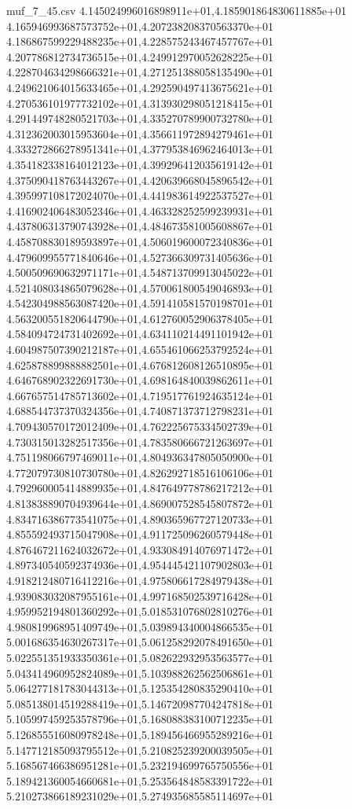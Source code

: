 \begin{filecontents*}{muf_7_45.csv}
4.145024996016898911e+01,4.185901864830611885e+01
4.165946993687573752e+01,4.207238208370563370e+01
4.186867599229488235e+01,4.228575243467457767e+01
4.207786812734736515e+01,4.249912970052628225e+01
4.228704634298666321e+01,4.271251388058135490e+01
4.249621064015633465e+01,4.292590497413675621e+01
4.270536101977732102e+01,4.313930298051218415e+01
4.291449748280521703e+01,4.335270789900732780e+01
4.312362003015953604e+01,4.356611972894279461e+01
4.333272866278951341e+01,4.377953846962464013e+01
4.354182338164012123e+01,4.399296412035619142e+01
4.375090418763443267e+01,4.420639668045896542e+01
4.395997108172024070e+01,4.441983614922537527e+01
4.416902406483052346e+01,4.463328252599239931e+01
4.437806313790743928e+01,4.484673581005608867e+01
4.458708830189593897e+01,4.506019600072340836e+01
4.479609955771840646e+01,4.527366309731405636e+01
4.500509690632971171e+01,4.548713709913045022e+01
4.521408034865079628e+01,4.570061800549046893e+01
4.542304988563087420e+01,4.591410581570198701e+01
4.563200551820644790e+01,4.612760052906378405e+01
4.584094724731402692e+01,4.634110214491101942e+01
4.604987507390212187e+01,4.655461066253792524e+01
4.625878899888882501e+01,4.676812608126510895e+01
4.646768902322691730e+01,4.698164840039862611e+01
4.667657514785713602e+01,4.719517761924635124e+01
4.688544737370324356e+01,4.740871373712798231e+01
4.709430570172012409e+01,4.762225675334502739e+01
4.730315013282517356e+01,4.783580666721263697e+01
4.751198066797469011e+01,4.804936347805050900e+01
4.772079730810730780e+01,4.826292718516106106e+01
4.792960005414889935e+01,4.847649778786217212e+01
4.813838890704939644e+01,4.869007528545807872e+01
4.834716386773541075e+01,4.890365967727120733e+01
4.855592493715047908e+01,4.911725096260579448e+01
4.876467211624032672e+01,4.933084914076971472e+01
4.897340540592374936e+01,4.954445421107902803e+01
4.918212480716412216e+01,4.975806617284979438e+01
4.939083032087955161e+01,4.997168502539716428e+01
4.959952194801360292e+01,5.018531076802810276e+01
4.980819968951409749e+01,5.039894340004866535e+01
5.001686354630267317e+01,5.061258292078491650e+01
5.022551351933350361e+01,5.082622932953563577e+01
5.043414960952824089e+01,5.103988262562506861e+01
5.064277181783044313e+01,5.125354280835290410e+01
5.085138014519288419e+01,5.146720987704247818e+01
5.105997459253578796e+01,5.168088383100712235e+01
5.126855516080978248e+01,5.189456466955289216e+01
5.147712185093795512e+01,5.210825239200039505e+01
5.168567466386951281e+01,5.232194699765750556e+01
5.189421360054660681e+01,5.253564848583391722e+01
5.210273866189231029e+01,5.274935685585114697e+01

\end{filecontents*}

